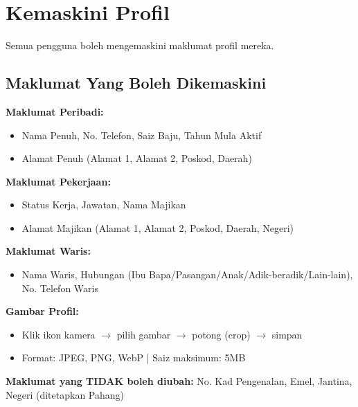 \documentclass[12pt,a4paper]{report}
\begin{document}
\section{Kemaskini Profil}

Semua pengguna boleh mengemaskini maklumat profil mereka.

\subsection{Maklumat Yang Boleh Dikemaskini}

\textbf{Maklumat Peribadi:}
\begin{itemize}[label=\textcolor{pbnpblue}{\faChevronRight}, nosep]
  \item Nama Penuh, No. Telefon, Saiz Baju, Tahun Mula Aktif
  \item Alamat Penuh (Alamat 1, Alamat 2, Poskod, Daerah)
\end{itemize}

\textbf{Maklumat Pekerjaan:}
\begin{itemize}[label=\textcolor{pbnpblue}{\faChevronRight}, nosep]
  \item Status Kerja, Jawatan, Nama Majikan
  \item Alamat Majikan (Alamat 1, Alamat 2, Poskod, Daerah, Negeri)
\end{itemize}

\textbf{Maklumat Waris:}
\begin{itemize}[label=\textcolor{pbnpblue}{\faChevronRight}, nosep]
  \item Nama Waris, Hubungan (Ibu Bapa/Pasangan/Anak/Adik-beradik/Lain-lain), No. Telefon Waris
\end{itemize}

\textbf{Gambar Profil:}
\begin{itemize}[label=\textcolor{pbnpblue}{\faChevronRight}, nosep]
  \item Klik ikon kamera $\rightarrow$ pilih gambar $\rightarrow$ potong (crop) $\rightarrow$ simpan
  \item Format: JPEG, PNG, WebP | Saiz maksimum: 5MB
\end{itemize}

\begin{importantbox}
\textbf{Maklumat yang TIDAK boleh diubah:} No. Kad Pengenalan, Emel, Jantina, Negeri (ditetapkan Pahang)
\end{importantbox}

\end{document}
